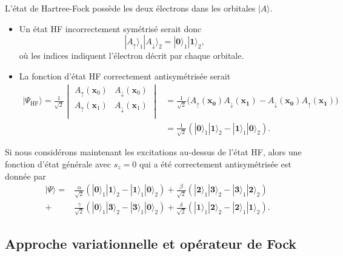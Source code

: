 \documentclass[12pt,a4paper]{article} %
\numberwithin{equation}{section} %
\numberwithin{figure}{section} %
\numberwithin{table}{section} %
\begin{document}
L'état de Hartree-Fock possède les deux électrons dans les orbitales $|A\rangle$.
\begin{itemize}
\item Un état HF incorrectement symétrisé serait donc
\begin{equation}
|A_\uparrow\rangle_1|A_\downarrow\rangle_2 = |\mathbf{0}\rangle_1|\mathbf{1}\rangle_2,
\end{equation}
où les indices indiquent l'électron décrit par chaque orbitale.

\item La fonction d'état HF correctement antisymétrisée serait
\begin{equation}
\begin{split}
    |\Psi_{\mathrm{HF}}\rangle =  \frac{1}{\sqrt{2}}
        \begin{vmatrix}
        A_\uparrow(\mathbf{x}_0) & A_\downarrow(\mathbf{x}_0)\\
        A_\uparrow(\mathbf{x}_1) & A_\downarrow(\mathbf{x}_1)\\
        \end{vmatrix}
        &= \frac{1}{\sqrt{2}}  \Big( A_\uparrow(\mathbf{x_0}) A_\downarrow(\mathbf{x_1}) - A_\downarrow(\mathbf{x_0}) A_\uparrow(\mathbf{x_1})  \Big)\\
&=\frac{1}{\sqrt{2}} (|\mathbf{0}\rangle_1|\mathbf{1}\rangle_2 - |\mathbf{1}\rangle_1|\mathbf{0}\rangle_2 ).
\end{split}
\end{equation}
\end{itemize}

Si nous considérons maintenant les excitations au-dessus de l'état HF, alors une fonction d'état générale avec $s_z=0$ qui a été correctement antisymétrisée est donnée par
\begin{equation}
\begin{aligned}
|\Psi\rangle =& \frac{\alpha}{\sqrt{2}}(|\mathbf{0}\rangle_1|\mathbf{1}\rangle_2 - |\mathbf{1}\rangle_1|\mathbf{0}\rangle_2 ) 
+\frac{\beta}{\sqrt{2}} (|\mathbf{2}\rangle_1|\mathbf{3}\rangle_2 - |\mathbf{3}\rangle_1|\mathbf{2}\rangle_2 ) \\
+& \frac{\gamma}{\sqrt{2}} (|\mathbf{0}\rangle_1|\mathbf{3}\rangle_2 - |\mathbf{3}\rangle_1|\mathbf{0}\rangle_2 ) + \frac{\delta}{\sqrt{2}} (|\mathbf{1}\rangle_1|\mathbf{2}\rangle_2 - |\mathbf{2}\rangle_1|\mathbf{1}\rangle_2 ).
\end{aligned}
\end{equation}

\subsection{Approche variationnelle et opérateur de Fock}
\end{document}
